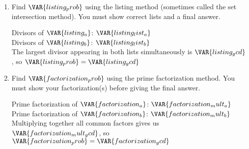 
\begin{enumerate}

    \item Find $\VAR{listing_prob}$ using the listing method (sometimes called the set intersection method). You must show correct lists and a final answer.

    \vfill

    \begin{ansenv}
        Divisors of $\VAR{listing_a}$: $\VAR{listing_list_a}$\\

        Divisors of $\VAR{listing_b}$: $\VAR{listing_list_b}$\\

        The largest divisor appearing in both lists simultaneously is $\VAR{listing_gcd}$, so $\VAR{listing_prob} = \VAR{listing_gcd}$
    \end{ansenv}

    \vfill

    \item Find $\VAR{factorization_prob}$ using the prime factorization method. You must show your factorization(s) before giving the final answer.

    \vfill

    \begin{ansenv}
        Prime factorization of $\VAR{factorization_a}$: $\VAR{factorization_mult_a}$\\

        Prime factorization of $\VAR{factorization_b}$: $\VAR{factorization_mult_b}$\\

        Multiplying together all common factors gives us $\VAR{factorization_mult_gcd}$, so $\VAR{factorization_prob} = \VAR{factorization_gcd}$
    \end{ansenv}

    \vfill

\end{enumerate}

\trueemptypage